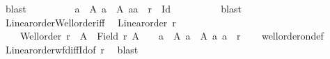 \begin{isabellebody}
\ blast\isanewline
\ \ \ \ \ \ \isamarkupfalse%
\ \isamarkupfalse%
\ {\isachardoublequoteopen}{\isasymexists}a\ {\isasymin}\ A{\isachardot}{\kern0pt}\ {\isasymforall}a{\isacharprime}{\kern0pt}\ {\isasymin}\ A{\isachardot}{\kern0pt}\ {\isacharparenleft}{\kern0pt}a{\isacharprime}{\kern0pt}{\isacharcomma}{\kern0pt}a{\isacharparenright}{\kern0pt}\ {\isasymnotin}\ r\ {\isacharminus}{\kern0pt}\ Id{\isachardoublequoteclose}\isanewline
\ \ \ \ \ \ \ \ \isamarkupfalse%
\ blast\isanewline
\ \ \ \ \isamarkupfalse%
\isanewline
\ \ \isamarkupfalse%
\isanewline
{}\isamarkupfalse%
%
\endisatagproof
{\isafoldproof}%
%
\isadelimproof
\isanewline
%
\endisadelimproof
\isanewline
{}\isamarkupfalse%
\ Linear{\isacharunderscore}{\kern0pt}order{\isacharunderscore}{\kern0pt}Well{\isacharunderscore}{\kern0pt}order{\isacharunderscore}{\kern0pt}iff{\isacharcolon}{\kern0pt}\isanewline
\ \ {\isachardoublequoteopen}Linear{\isacharunderscore}{\kern0pt}order\ r\ {\isasymLongrightarrow}\isanewline
\ \ \ \ Well{\isacharunderscore}{\kern0pt}order\ r\ {\isasymlongleftrightarrow}\ {\isacharparenleft}{\kern0pt}{\isasymforall}A\ {\isasymsubseteq}\ Field\ r{\isachardot}{\kern0pt}\ A\ {\isasymnoteq}\ {\isacharbraceleft}{\kern0pt}{\isacharbraceright}{\kern0pt}\ {\isasymlongrightarrow}\ {\isacharparenleft}{\kern0pt}{\isasymexists}a\ {\isasymin}\ A{\isachardot}{\kern0pt}\ {\isasymforall}a{\isacharprime}{\kern0pt}\ {\isasymin}\ A{\isachardot}{\kern0pt}\ {\isacharparenleft}{\kern0pt}a{\isacharcomma}{\kern0pt}\ a{\isacharprime}{\kern0pt}{\isacharparenright}{\kern0pt}\ {\isasymin}\ r{\isacharparenright}{\kern0pt}{\isacharparenright}{\kern0pt}{\isachardoublequoteclose}\isanewline
%
\isadelimproof
\ \ %
\endisadelimproof
%
\isatagproof
{}\isamarkupfalse%
\ well{\isacharunderscore}{\kern0pt}order{\isacharunderscore}{\kern0pt}on{\isacharunderscore}{\kern0pt}def\ \isamarkupfalse%
\ Linear{\isacharunderscore}{\kern0pt}order{\isacharunderscore}{\kern0pt}wf{\isacharunderscore}{\kern0pt}diff{\isacharunderscore}{\kern0pt}Id{\isacharbrackleft}{\kern0pt}of\ r{\isacharbrackright}{\kern0pt}\ \isamarkupfalse%
\ blast%
\endisatagproof
{\isafoldproof}%
%
\isadelimproof
\isanewline
%
\endisadelimproof
%
\isadelimtheory
\isanewline
%
\endisadelimtheory
%
\isatagtheory
{}\isamarkupfalse%
%
\endisatagtheory
{\isafoldtheory}%
%
\isadelimtheory
%
\endisadelimtheory
%
\end{isabellebody}%
\endinput
